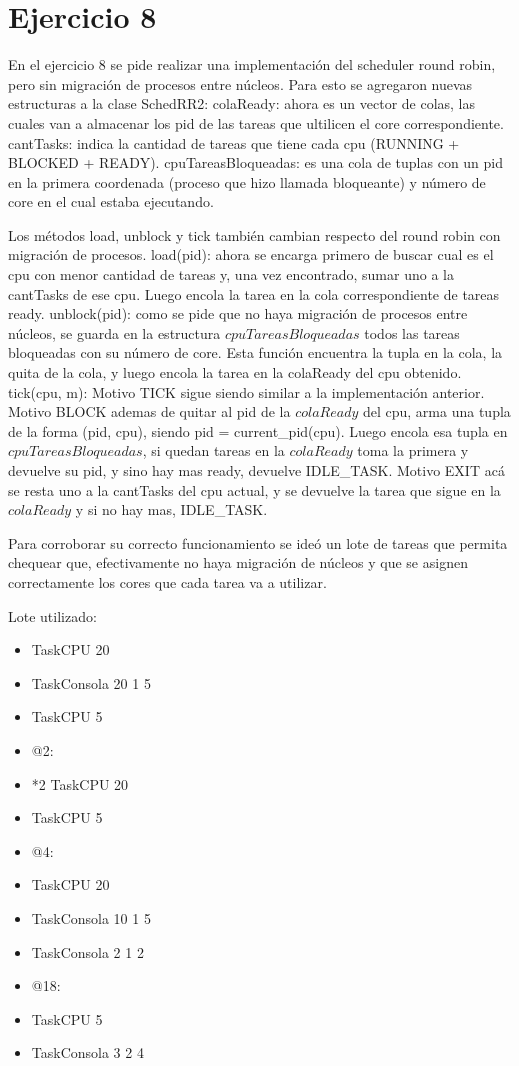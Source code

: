 \section{Ejercicio 8}

En el ejercicio 8 se pide realizar una implementación del scheduler round robin, pero sin migración de procesos entre núcleos.
Para esto se agregaron nuevas estructuras a la clase SchedRR2:
colaReady: ahora es un vector de colas, las cuales van a almacenar los pid de las tareas que ultilicen el core correspondiente.
cantTasks: indica la cantidad de tareas que tiene cada cpu (RUNNING + BLOCKED + READY).
cpuTareasBloqueadas: es una cola de tuplas con un pid en la primera coordenada (proceso que hizo llamada bloqueante) y número de core en el cual estaba ejecutando.

Los métodos load, unblock y tick también cambian respecto del round robin con migración de procesos.
load(pid): ahora se encarga primero de buscar cual es el cpu con menor cantidad de tareas y, una vez encontrado, sumar uno a la cantTasks de ese cpu. Luego encola la tarea en la cola correspondiente de tareas ready.
unblock(pid): como se pide que no haya migración de procesos entre núcleos, se guarda en la estructura $cpuTareasBloqueadas$ todos las tareas bloqueadas con su número de 
core. Esta función encuentra la tupla en la cola, la quita de la cola, y luego encola la tarea en la colaReady del cpu obtenido.
tick(cpu, m): 
Motivo TICK sigue siendo similar a la implementación anterior.
Motivo BLOCK ademas de quitar al pid de la $colaReady$ del cpu, arma una tupla de la forma (pid, cpu), siendo pid = current_pid(cpu). Luego encola esa tupla en $cpuTareasBloqueadas$, 
si quedan tareas en la $colaReady$ toma la primera y devuelve su pid, y sino hay mas ready, devuelve IDLE_TASK.
Motivo EXIT acá se resta uno a la cantTasks del cpu actual, y se devuelve la tarea que sigue en la $colaReady$ y si no hay mas, IDLE_TASK.

Para corroborar su correcto funcionamiento se ideó un lote de tareas que permita chequear que, efectivamente no haya migración de núcleos y que se asignen correctamente 
los cores que cada tarea va a utilizar. 

Lote utilizado:
\begin{itemize}
	\item TaskCPU 20		
	\item TaskConsola 20 1 5	
	\item TaskCPU 5
	\item @2: 
	\item *2 TaskCPU 20
	\item TaskCPU 5
	\item @4:
	\item TaskCPU 20
	\item TaskConsola 10 1 5
	\item TaskConsola 2 1 2
	\item @18:				
	\item TaskCPU 5
	\item TaskConsola 3 2 4
\end{itemize}

